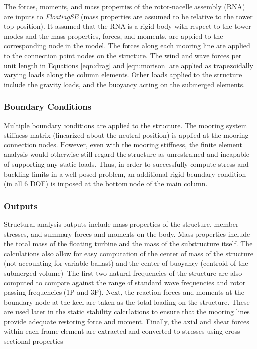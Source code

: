 The forces, moments, and mass properties of the rotor-nacelle assembly
(RNA) are inputs to \textit{FloatingSE} (mass properties are assumed to
be relative to the tower top position).  It assumed that the RNA is a
rigid body with respect to the tower modes and the mass properties,
forces, and moments, are applied to the corresponding node in the model.
The forces along each mooring line are applied to the connection
point nodes on the structure.  The wind and wave forces per unit length
in Equations \ref{eqn:drag} and \ref{eqn:morison} are applied as
trapezoidally varying loads along the column elements.  Other loads
applied to the structure include the gravity loads, and the buoyancy
acting on the submerged elements.

\subsubsection{Boundary Conditions}
Multiple boundary conditions are applied to the structure.  The mooring
system stiffness matrix (linearized about the neutral position) is
applied at the mooring connection nodes.  However, even with the mooring
stiffness, the finite element analysis would otherwise still regard the
structure as unrestrained and incapable of supporting any static loads.
Thus, in order to successfully compute stress and buckling limits in a
well-posed problem, an additional rigid boundary condition (in all 6
DOF) is imposed at the bottom node of the main column.

\subsubsection{Outputs}
Structural analysis outputs include mass properties of the structure,
member stresses, and summary forces and moments on the body.  Mass
properties include the total mass of the floating turbine and the mass
of the substructure itself.  The calculations also allow for easy
computation of the center of mass of the structure (not accounting for
variable ballast) and the center of buoyancy (centroid of the submerged
volume).  The first two natural frequencies of the structure are also
computed to compare against the range of standard wave frequencies and
rotor passing frequencies (1P and 3P).  Next, the reaction forces and
moments at the boundary node at the keel are taken as the total loading
on the structure.  These are used later in the static stability
calculations to ensure that the mooring lines provide adequate restoring
force and moment.  Finally, the axial and shear forces within each frame
element are extracted and converted to stresses using cross-sectional
properties.

